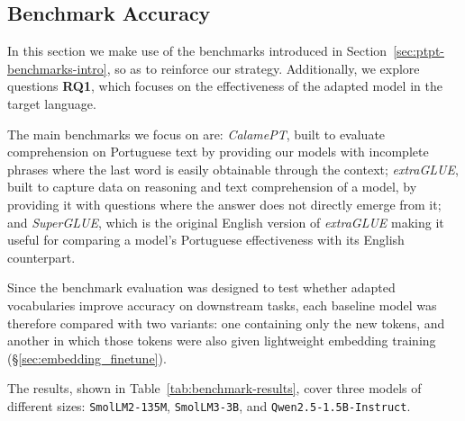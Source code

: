 \subsection{Benchmark Accuracy}
In this section we make use of the benchmarks introduced in Section~\ref{sec:ptpt-benchmarks-intro}, so as to reinforce our strategy. Additionally, we explore questions \textbf{RQ1}, which focuses on the effectiveness of the adapted model in the target language.

The main benchmarks we focus on are: \textit{CalamePT}, built to evaluate comprehension on Portuguese text by providing our models with incomplete phrases where the last word is easily obtainable through the context; \textit{extraGLUE}, built to capture data on reasoning and text comprehension of a model, by providing it with questions where the answer does not directly emerge from it; and \textit{SuperGLUE}, which is the original English version of \textit{extraGLUE} making it useful for comparing a model’s Portuguese effectiveness with its English counterpart.

Since the benchmark evaluation was designed to test whether adapted vocabularies improve accuracy on downstream tasks, each baseline model was therefore compared with two variants: one containing only the new tokens, and another in which those tokens were also given lightweight embedding training (\S\ref{sec:embedding_finetune}).

The results, shown in Table~\ref{tab:benchmark-results}, cover three models of different sizes: \texttt{SmolLM2-135M}, \texttt{SmolLM3-3B}, and \texttt{Qwen2.5-1.5B-Instruct}.

